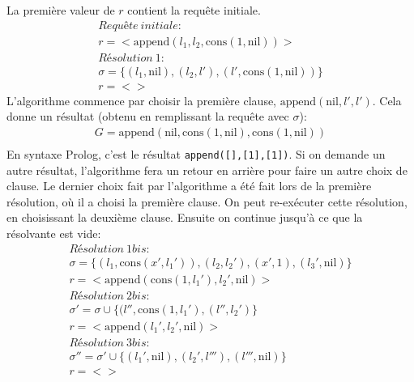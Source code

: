 La première valeur de $r$ contient la requête initiale.
\begin{equation}
\begin{array}{l}
\mathit{Requête\ initiale:} \\
r = < \mathrm{append}(l_1, l_2, \mathrm{cons}(1,\mathrm{nil})) > \\
\mathit{Résolution\ 1:} \\
\sigma = \{ (l_1,\mathrm{nil}), (l_2, l'), (l',\mathrm{cons}(1,\mathrm{nil})) \} \\
r =  < >
\end{array}
\end{equation}
L'algorithme commence par choisir la première clause, $\mathrm{append}(\mathrm{nil},l',l')$.
Cela donne un résultat (obtenu en remplissant la requête avec $\sigma$):
\begin{equation}
\begin{array}{l}
G = \mathrm{append}(\mathrm{nil}, \mathrm{cons}(1,\mathrm{nil}), \mathrm{cons}(1,\mathrm{nil})) \\
\end{array}
\end{equation}
En syntaxe Prolog, c'est le résultat \verb+append([],[1],[1])+.
Si on demande un autre résultat,
l'algorithme fera un retour en arrière pour faire un autre choix de clause.
Le dernier choix fait par l'algorithme a été fait lors de la première résolution,
où il a choisi la première clause.
On peut re-exécuter cette résolution, en choisissant la deuxième clause.
Ensuite on continue jusqu'à ce que la résolvante est vide:
\begin{equation}
\begin{array}{l}
\mathit{Résolution\ 1bis:} \\
\sigma = \{ (l_1,\mathrm{cons}(x',l_1')), (l_2,l_2'), (x',1), (l_3',\mathrm{nil}) \} \\
r = < \mathrm{append}(\mathrm{cons}(1,l_1'), l_2', \mathrm{nil}) > \\
\mathit{Résolution\ 2bis:} \\
\sigma' = \sigma \cup \{ (l'',\mathrm{cons}(1,l_1'), (l'',l_2') \} \\
r = < \mathrm{append}(l_1', l_2', \mathrm{nil})> \\
\mathit{Résolution\ 3bis:} \\
\sigma'' = \sigma' \cup \{ (l_1',\mathrm{nil}), (l_2',l'''), (l''',\mathrm{nil}) \} \\
r = < >
\end{array}
\end{equation}
